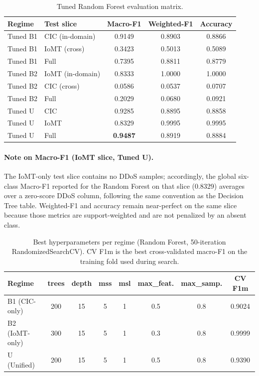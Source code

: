 \begin{table}[H]
\centering
\caption{Tuned Random Forest evaluation matrix.}
\label{tab:rf-tuned}
\small
\begin{tabular}{@{}l l c c c@{}}
\toprule
\textbf{Regime} & \textbf{Test slice} & \textbf{Macro-F1} & \textbf{Weighted-F1} & \textbf{Accuracy} \\
\midrule
Tuned B1 & CIC (in-domain)  & 0.9149 & 0.8903 & 0.8866 \\
Tuned B1 & IoMT (cross)     & 0.3423 & 0.5013 & 0.5089 \\
Tuned B1 & Full             & 0.7395 & 0.8811 & 0.8779 \\
\midrule
Tuned B2 & IoMT (in-domain) & 0.8333 & 1.0000 & 1.0000 \\
Tuned B2 & CIC (cross)      & 0.0586 & 0.0537 & 0.0707 \\
Tuned B2 & Full             & 0.2029 & 0.0680 & 0.0921 \\
\midrule
Tuned U  & CIC              & 0.9285 & 0.8895 & 0.8858 \\
Tuned U  & IoMT             & 0.8329 & 0.9995 & 0.9995 \\
Tuned U  & Full             & \textbf{0.9487} & 0.8919 & 0.8884 \\
\bottomrule
\end{tabular}
\end{table}

\paragraph{Note on Macro-F1 (IoMT slice, Tuned U).}
The IoMT-only test slice contains no DDoS samples; accordingly, the global six-class Macro-F1 reported for the Random Forest on that slice (0.8329) averages over a zero-score DDoS column, following the same convention as the Decision Tree table. Weighted-F1 and accuracy remain near-perfect on the same slice because those metrics are support-weighted and are not penalized by an absent class.

\begin{table}[H]
\centering
\caption{Best hyperparameters per regime (Random Forest, 50-iteration RandomizedSearchCV). CV F1m is the best cross-validated macro-F1 on the training fold used during search.}
\label{tab:rf-best-params}
\small
\begin{tabular}{@{}l c c c c c c c@{}}
\toprule
\textbf{Regime} & \textbf{trees} & \textbf{depth} & \textbf{mss} & \textbf{msl} & \textbf{max\_feat.} & \textbf{max\_samp.} & \textbf{CV F1m} \\
\midrule
B1 (CIC-only)  & 200 & 15 & 5 & 1 & 0.5 & 0.8 & 0.9024 \\
B2 (IoMT-only) & 300 & 15 & 5 & 1 & 0.3 & 0.8 & 0.9999 \\
U (Unified)    & 200 & 15 & 5 & 1 & 0.5 & 0.8 & 0.9390 \\
\bottomrule
\end{tabular}
\end{table}

